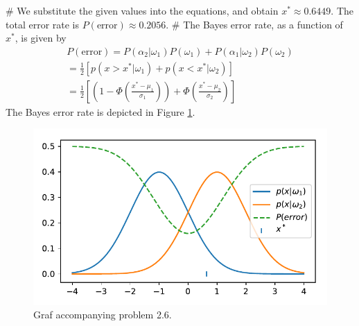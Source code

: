 \documentclass[12pt, a4paper]{article}
\begin{document}
\begin{easylist}[enumerate]
# We substitute the given values into the equations, and obtain $x^* \approx 0.6449$. The total error rate is $P(\text{error}) \approx 0.2056$.
# The Bayes error rate, as a function of $x^*$, is given by
\begin{align*}
	P(\text{error}) = P(\alpha_2 | \omega_1) P(\omega_1) + P(\alpha_1| \omega_2) P(\omega_2) \\
	= \frac{1}{2} \left[ p( x > x^*| \omega_1)  + p( x < x^* | \omega_2) \right]   \\
	= \frac{1}{2} \left[ \left( 1 - \Phi \left( \frac{x^* - \mu_1}{\sigma_1}\right)\right) +  \Phi \left( \frac{x^* - \mu_2}{\sigma_2}\right)  \right]
\end{align*}
The Bayes error rate is depicted in Figure \ref{fig:duda_ch2_prob6}.

\begin{figure}[ht!]
\centering
\includegraphics[width=0.5\linewidth]{figs/duda_ch2_prob6}
\caption{Graf accompanying problem 2.6.}
\label{fig:duda_ch2_prob6}
\end{figure}


\end{easylist}
\end{document}
